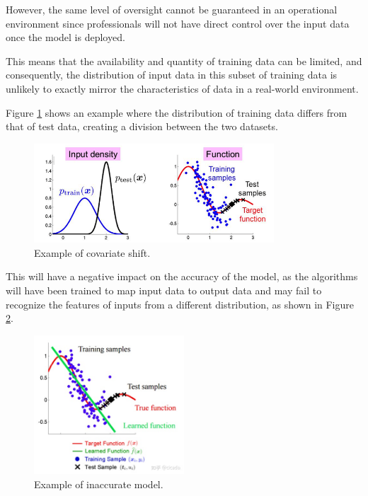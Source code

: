 However, the same level of oversight cannot be guaranteed in an operational environment since professionals will not have direct control over the input data once the model is deployed.  

This means that the availability and quantity of training data can be limited, and consequently, the distribution of input data in this subset of training data is unlikely to exactly mirror the characteristics of data in a real-world environment.

Figure \ref{covariate-shift} shows an example where the distribution of training data differs from that of test data, creating a division between the two datasets.  

\vspace{0.5cm}  
\begin{figure}[h!]
    \centering
    \includegraphics[width=0.8\textwidth]{../src/assets/immagine.png} 
    \caption{Example of covariate shift.}
    \label{covariate-shift}
\end{figure}

This will have a negative impact on the accuracy of the model, as the algorithms will have been trained to map input data to output data and may fail to recognize the features of inputs from a different distribution, as shown in Figure \cref{inaccurate-model}.  

\begin{figure}[h!]
    \centering
    \includegraphics[width=0.5\textwidth]{../src/assets/covariate_shift.png} 
    \caption{Example of inaccurate model.}
    \label{inaccurate-model}
\end{figure}  


